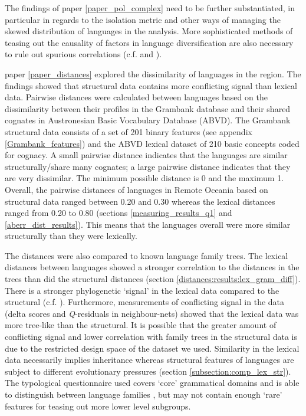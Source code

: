 \documentclass[draft,10pt]{article} %
\begin{document}

The findings of paper \ref{paper_pol_complex} need to be further substantiated, in particular in regards to the isolation metric and other ways of managing the skewed distribution of languages in the analysis. More sophisticated methods of teasing out the causality of factors in language diversification are also necessary to rule out spurious correlations (c.f. \cite{Sean_2018} and \cite{Pacheco_Coelho_2019}). 

paper \ref{paper_distances} explored the dissimilarity of languages in the region. The findings showed that structural data contains more conflicting signal than lexical data. Pairwise distances were calculated between languages based on the dissimilarity between their profiles in the Grambank database and their shared cognates in Austronesian Basic Vocabulary Database (ABVD). The Grambank structural data consists of a set of 201 binary features (see appendix \ref{Grambank_features}) and the ABVD lexical dataset of 210 basic concepts coded for cognacy. A small pairwise distance indicates that the languages are similar structurally/share many cognates; a large pairwise distance indicates that they are very dissimilar. The minimum possible distance is 0 and the maximum 1. Overall, the pairwise distances of languages in Remote Oceania based on structural data ranged between 0.20 and 0.30 whereas the lexical distances ranged from 0.20 to 0.80 (sections \ref{measuring_results_q1} and \ref{aberr_dist_results}). This means that the languages overall were more similar structurally than they were lexically.

The distances were also compared to known language family trees. The lexical distances between languages showed a stronger correlation to the distances in the trees than did the structural distances (section \ref{distances:results:lex_gram_diff}). There is a stronger phylogenetic `signal' in the lexical data compared to the structural (c.f. \cite{greenhilletal_2017}). Furthermore, measurements of conflicting signal in the data (delta scores and \emph{Q}-residuals in neighbour-nets) showed that the lexical data was more tree-like than the structural. It is possible that the greater amount of conflicting signal and lower correlation with family trees in the structural data is due to the restricted design space of the dataset we used. Similarity in the lexical data necessarily implies inheritance whereas structural features of languages are subject to different evolutionary pressures (section \ref{subsection:comp_lex_str}). The typological questionnaire used covers `core' grammatical domains and is able to distinguish between language families \citep{grambank_release}, but may not contain enough `rare' features for teasing out more lower level subgroups.
\end{document}
